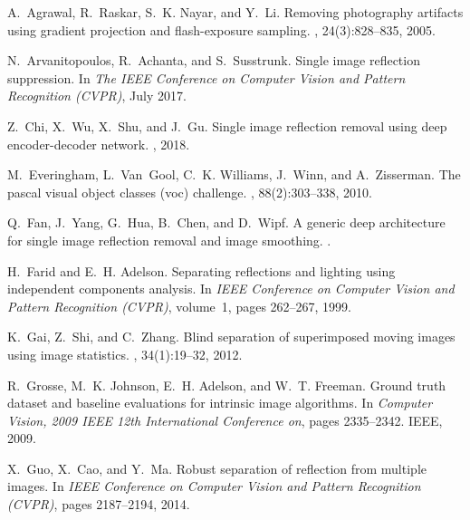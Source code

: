 \documentclass[10pt,twocolumn,letterpaper]{article}
\begin{document}
{\small

\begin{thebibliography}{10}\itemsep=-1pt

A.~Agrawal, R.~Raskar, S.~K. Nayar, and Y.~Li.
\newblock Removing photography artifacts using gradient projection and
  flash-exposure sampling.
, 24(3):828--835, 2005.

N.~Arvanitopoulos, R.~Achanta, and S.~Susstrunk.
\newblock Single image reflection suppression.
\newblock In {\em The IEEE Conference on Computer Vision and Pattern
  Recognition (CVPR)}, July 2017.

Z.~Chi, X.~Wu, X.~Shu, and J.~Gu.
\newblock Single image reflection removal using deep encoder-decoder network.
, 2018.

M.~Everingham, L.~Van~Gool, C.~K. Williams, J.~Winn, and A.~Zisserman.
\newblock The pascal visual object classes (voc) challenge.
, 88(2):303--338, 2010.

Q.~Fan, J.~Yang, G.~Hua, B.~Chen, and D.~Wipf.
\newblock A generic deep architecture for single image reflection removal and
  image smoothing.
.

H.~Farid and E.~H. Adelson.
\newblock Separating reflections and lighting using independent components
  analysis.
\newblock In {\em IEEE Conference on Computer Vision and Pattern Recognition
  (CVPR)}, volume~1, pages 262--267, 1999.

K.~Gai, Z.~Shi, and C.~Zhang.
\newblock Blind separation of superimposed moving images using image
  statistics.
, 34(1):19--32, 2012.

R.~Grosse, M.~K. Johnson, E.~H. Adelson, and W.~T. Freeman.
\newblock Ground truth dataset and baseline evaluations for intrinsic image
  algorithms.
\newblock In {\em Computer Vision, 2009 IEEE 12th International Conference on},
  pages 2335--2342. IEEE, 2009.

X.~Guo, X.~Cao, and Y.~Ma.
\newblock Robust separation of reflection from multiple images.
\newblock In {\em IEEE Conference on Computer Vision and Pattern Recognition
  (CVPR)}, pages 2187--2194, 2014.


\end{thebibliography}}
\end{document}
